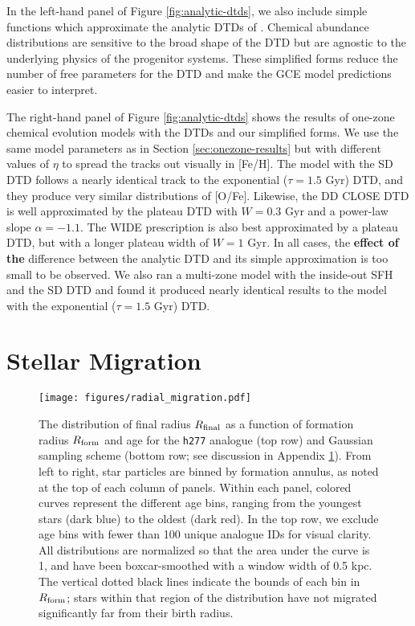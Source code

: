 \documentclass[twocolumn,twocolappendix,linenumbers]{aastex631}
\newcommand{\hydro}{{\tt h277}\xspace}
\begin{document}
In the left-hand panel of Figure \ref{fig:analytic-dtds}, we also include simple functions which approximate the analytic DTDs of \citet{Greggio2005-AnalyticalRates}. Chemical abundance distributions are sensitive to the broad shape of the DTD but are agnostic to the underlying physics of the progenitor systems. These simplified forms reduce the number of free parameters for the DTD and make the GCE model predictions easier to interpret.

The right-hand panel of Figure \ref{fig:analytic-dtds} shows the results of one-zone chemical evolution models with the \citet{Greggio2005-AnalyticalRates} DTDs and our simplified forms. We use the same model parameters as in Section \ref{sec:onezone-results} but with different values of $\eta$ to spread the tracks out visually in [Fe/H]. The model with the SD DTD follows a nearly identical track to the exponential ($\tau=1.5$ Gyr) DTD, and they produce very similar distributions of [O/Fe]. Likewise, the DD CLOSE DTD is well approximated by the plateau DTD with $W=0.3$ Gyr and a power-law slope $\alpha=-1.1$. The WIDE prescription is also best approximated by a plateau DTD, but with a longer plateau width of $W=1$ Gyr. In all cases, the {\bf effect of the} difference between the analytic DTD and its simple approximation is too small to be observed. We also ran a multi-zone model with the inside-out SFH and the \citet{Greggio2005-AnalyticalRates} SD DTD and found it produced nearly identical results to the model with the exponential ($\tau=1.5$ Gyr) DTD.

\section{Stellar Migration}
\label{app:migration}

\begin{figure*}
    \centering
    \texttt{[image: figures/radial\_migration.pdf]}
    \caption{The distribution of final radius $R_{\rm final}$ as a function of formation radius $R_{\rm form}$ and age for the \hydro analogue (top row) and Gaussian sampling scheme (bottom row; see discussion in Appendix \ref{app:migration}). From left to right, star particles are binned by formation annulus, as noted at the top of each column of panels. Within each panel, colored curves represent the different age bins, ranging from the youngest stars (dark blue) to the oldest (dark red). In the top row, we exclude age bins with fewer than 100 unique analogue IDs for visual clarity. All distributions are normalized so that the area under the curve is 1, and have been boxcar-smoothed with a window width of 0.5 kpc. The vertical dotted black lines indicate the bounds of each bin in $R_{\rm form}$; stars within that region of the distribution have not migrated significantly far from their birth radius.}
    \label{fig:radial-migration}
\end{figure*}
\end{document}

